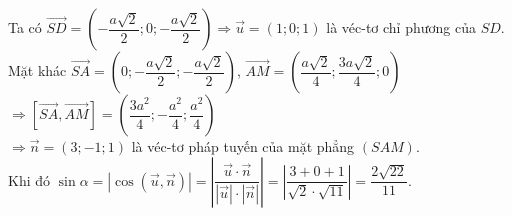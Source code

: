 \begin{ex}
{{
		}
		\noindent Ta có $\vec{SD}=\left(-\dfrac{a\sqrt{2}}{2};0;-\dfrac{a\sqrt{2}}{2}\right)\Rightarrow \vec{u}=\left(1;0;1\right)$ là véc-tơ chỉ phương của $SD.$\\
		Mặt khác $\vec{SA}=\left(0;-\dfrac{a\sqrt{2}}{2};-\dfrac{a\sqrt{2}}{2}\right)$, $\vec{AM}=\left(\dfrac{a\sqrt{2}}{4};\dfrac{3a\sqrt{2}}{4};0\right)$
		$\Rightarrow \left[\vec{SA},\vec{AM}\right]=\left(\dfrac{3a^2}{4};-\dfrac{a^2}{4};\dfrac{a^2}{4}\right)$\\
		$\Rightarrow \vec{n}=(3;-1;1)$ là véc-tơ pháp tuyến của mặt phẳng $(SAM).$\\
		Khi đó $\sin\alpha=\left|\cos(\vec{u},\vec{n})\right|=\left|\dfrac{\vec{u}\cdot \vec{n}}{|\vec{u}|\cdot |\vec{n}|}\right|=\left|\dfrac{3+0+1}{\sqrt{2}\cdot \sqrt{11}}\right|=\dfrac{2\sqrt{22}}{11}.$
	}
\end{ex}
